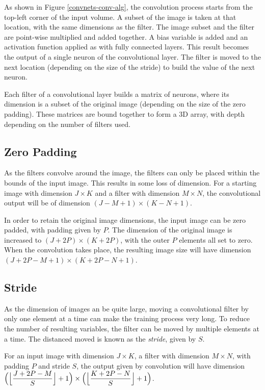 As shown in Figure \ref{convnets-conv-alg}, the convolution process starts from the top-left corner of the input volume. A subset of the image is taken at that location, with the same dimensions as the filter. The image subset and the filter are point-wise multiplied and added together. A bias variable is added and an activation function applied as with fully connected layers. This result becomes the output of a single neuron of the convolutional layer. The filter is moved to the next location (depending on the size of the stride) to build the value of the next neuron.

Each filter of a convolutional layer builds a matrix of neurons, where its dimension is a subset of the original image (depending on the size of the zero padding). These matrices are bound together to form a 3D array, with depth depending on the number of filters used.

\subsection{Zero Padding}\label{convnets-pad}

As the filters convolve around the image, the filters can only be placed within the bounds of the input image. This results in some loss of dimension. For a starting image with dimension $J \times K$ and a filter with dimension $M \times N$, the convolutional output will be of dimension $(J - M + 1)\times (K - N + 1)$.

In order to retain the original image dimensions, the input image can be zero padded, with padding given by $P$. The dimension of the original image is increased to $(J+2P) \times (K+2P)$, with the outer $P$ elements all set to zero. When the convolution takes place, the resulting image size will have dimension $(J+2P - M + 1) \times (K + 2P - N + 1)$.

\subsection{Stride}\label{convnets-stride}

As the dimension of images an be quite large, moving a convolutional filter by only one element at a time can make the training process very long. To reduce the number of resulting variables, the filter can be moved by multiple elements at a time. The distanced moved is known as the \textit{stride}, given by $S$.

For an input image with dimension $J \times K$, a filter with dimension $M \times N$, with padding $P$ and stride $S$, the output given by convolution will have dimension $\Big(\Bigl\lfloor \dfrac{J + 2P - M}{S}\Bigr\rfloor + 1\Big) \times \Big(\Bigl\lfloor \dfrac{K + 2P - N}{S} \Bigr\rfloor + 1\Big)$.

